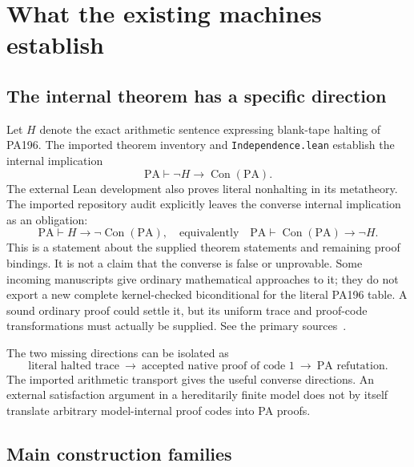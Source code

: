 \documentclass[11pt,letterpaper]{article}
\newcommand{\PA}{\mathrm{PA}}
\newcommand{\Con}{\operatorname{Con}}
\newcommand{\file}[1]{\texttt{\nolinkurl{#1}}}
\begin{document}
\section{What the existing machines establish}

\subsection{The internal theorem has a specific direction}

Let $H$ denote the exact arithmetic sentence expressing blank-tape halting
of PA196. The imported theorem inventory and \file{Independence.lean}
establish the internal implication
\[
 \PA\vdash\neg H\longrightarrow\Con(\PA).
\]
The external Lean development also proves literal nonhalting in its
metatheory. The imported repository audit explicitly leaves the converse
internal implication as an obligation:
\[
 \PA\vdash H\longrightarrow\neg\Con(\PA),
 \quad\text{equivalently}\quad
 \PA\vdash\Con(\PA)\longrightarrow\neg H.
\]
This is a statement about the supplied theorem statements and remaining
proof bindings. It is not a claim that the converse is false or unprovable.
Some incoming manuscripts give ordinary mathematical approaches to it;
they do not export a new complete kernel-checked biconditional for the
literal PA196 table. A sound ordinary proof could settle it, but its
uniform trace and proof-code transformations must actually be supplied.
See the primary sources~\cite{comparison,bridge,paper}.

The two missing directions can be isolated as
\[
 \text{literal halted trace}
 \ \longrightarrow\ \text{accepted native proof of code }1
 \ \longrightarrow\ \text{PA refutation}.
\]
The imported arithmetic transport gives the useful converse directions.
An external satisfaction argument in a hereditarily finite model does not
by itself translate arbitrary model-internal proof codes into PA proofs.

\subsection{Main construction families}
\end{document}

